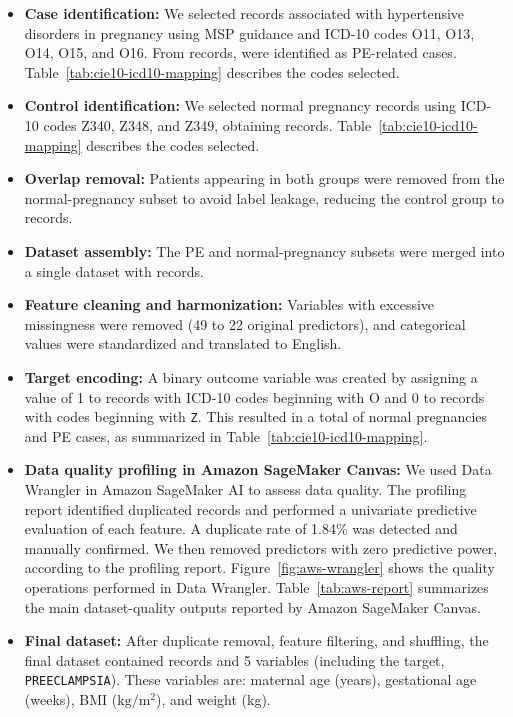 \documentclass[diagnostics,article,submit,pdftex,moreauthors]{Definitions/mdpi}
\begin{document}
\begin{itemize}
\item \textbf{Case identification:} We selected records associated with
  hypertensive disorders in pregnancy using \ac{MSP} guidance and
  \ac{ICD-10} codes O11, O13, O14, O15, and O16. From
   records,  were identified as
  \ac{PE}-related cases. Table~\ref{tab:cie10-icd10-mapping}
  describes the codes selected.

\item \textbf{Control identification:} We selected normal pregnancy
  records using \ac{ICD-10} codes Z340, Z348, and Z349, obtaining
   records. Table~\ref{tab:cie10-icd10-mapping}
  describes the codes selected.

\item \textbf{Overlap removal:} Patients appearing in both groups were
  removed from the normal-pregnancy subset to avoid label leakage,
  reducing the control group to  records.

\item \textbf{Dataset assembly:} The \ac{PE} and normal-pregnancy
  subsets were merged into a single dataset with 
  records.

\item \textbf{Feature cleaning and harmonization:} Variables with
  excessive missingness were removed (49 to 22 original predictors),
  and categorical values were standardized and translated to English.

\item \textbf{Target encoding:} A binary outcome variable was created
  by assigning a value of 1 to records with \ac{ICD-10} codes
  beginning with O and 0 to records with codes beginning with
  \texttt{Z}. This resulted in a total of  normal
  pregnancies and  \ac{PE} cases, as summarized in
  Table~\ref{tab:cie10-icd10-mapping}.

\item \textbf{Data quality profiling in Amazon SageMaker Canvas:} We used
  Data Wrangler in Amazon SageMaker AI to assess data quality. The profiling
  report identified duplicated records and performed a univariate
  predictive evaluation of each feature. A duplicate rate of 1.84\%
  was detected and manually confirmed. We then removed predictors with
  zero predictive power, according to the profiling report.
  Figure~\ref{fig:aws-wrangler} shows the quality operations performed
  in Data Wrangler. Table~\ref{tab:aws-report} summarizes the main
  dataset-quality outputs reported by Amazon SageMaker Canvas.

\item \textbf{Final dataset:} After duplicate removal, feature
  filtering, and shuffling, the final dataset contained
   records and 5 variables (including the target,
  \texttt{PREECLAMPSIA}). These variables are: maternal age (years),
  gestational age (weeks), \ac{BMI} ($\text{kg}/\text{m}^2$), and
  weight (kg). 
\end{itemize}
\end{document}
